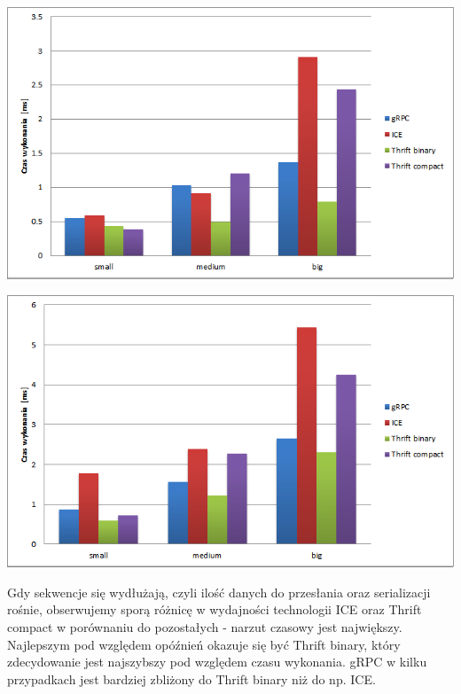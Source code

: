 \documentclass[12pt]{article}
\begin{document}
\begin{center}
\centering
    \includegraphics{localhost_seq100.png}
\end{center}
\begin{center}
\centering
    \includegraphics{localhost_seq1000.png}
\end{center}

Gdy sekwencje się wydłużają, czyli ilość danych do przesłania oraz serializacji rośnie, obserwujemy sporą różnicę w wydajności technologii ICE oraz Thrift compact w porównaniu do pozostałych - narzut czasowy jest największy. Najlepszym pod względem opóźnień okazuje się być Thrift binary, który zdecydowanie jest najszybszy pod względem czasu wykonania. gRPC w kilku przypadkach jest bardziej zbliżony do Thrift binary niż do np. ICE.
\end{document}
